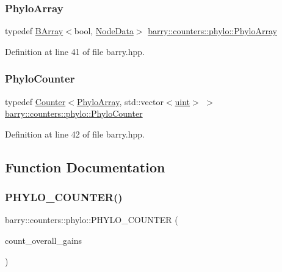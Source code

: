 \subsubsection{\texorpdfstring{Phylo\+Array}{PhyloArray}}
{\footnotesize\ttfamily typedef \hyperlink{classbarry_1_1_b_array}{B\+Array}$<$bool, \hyperlink{classbarry_1_1counters_1_1phylo_1_1_node_data}{Node\+Data}$>$ \hyperlink{namespacebarry_1_1counters_1_1phylo_a50a6652c16ff57d76b4099043d6a0bbb}{barry\+::counters\+::phylo\+::\+Phylo\+Array}}



Definition at line 41 of file barry.\+hpp.

\mbox{\label{namespacebarry_1_1counters_1_1phylo_aa4a36956c99f63ed02b7068a495bb56a}} 
\subsubsection{\texorpdfstring{Phylo\+Counter}{PhyloCounter}}
{\footnotesize\ttfamily typedef \hyperlink{classbarry_1_1_counter}{Counter}$<$\hyperlink{namespacebarry_1_1counters_1_1phylo_a50a6652c16ff57d76b4099043d6a0bbb}{Phylo\+Array}, std\+::vector$<$\hyperlink{namespacebarry_a11dfc53ddb4672278319aa04f1e09a6c}{uint}$>$ $>$ \hyperlink{namespacebarry_1_1counters_1_1phylo_aa4a36956c99f63ed02b7068a495bb56a}{barry\+::counters\+::phylo\+::\+Phylo\+Counter}}



Definition at line 42 of file barry.\+hpp.



\subsection{Function Documentation}
\mbox{\label{namespacebarry_1_1counters_1_1phylo_aff5bb18e1e512766165db69a49aa5faf}} 
\subsubsection{\texorpdfstring{P\+H\+Y\+L\+O\+\_\+\+C\+O\+U\+N\+T\+E\+R()}{PHYLO\_COUNTER()}\hspace{0.1cm}{\footnotesize\ttfamily [1/15]}}
{\footnotesize\ttfamily barry\+::counters\+::phylo\+::\+P\+H\+Y\+L\+O\+\_\+\+C\+O\+U\+N\+T\+ER (\begin{DoxyParamCaption}\item[{count\+\_\+overall\+\_\+gains}]{ }\end{DoxyParamCaption})}



